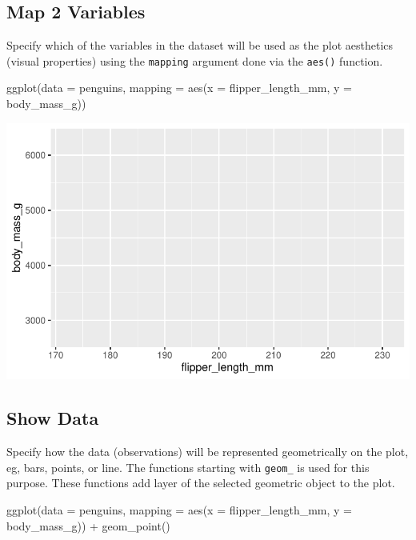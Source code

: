 \documentclass[
  letterpaper,
  DIV=11,
  numbers=noendperiod]{scrreprt}
\newenvironment{Shaded}{\begin{snugshade}}{\end{snugshade}}
\newcommand{\AttributeTok}[1]{\textcolor[rgb]{0.40,0.45,0.13}{#1}}
\newcommand{\FunctionTok}[1]{\textcolor[rgb]{0.28,0.35,0.67}{#1}}
\newcommand{\NormalTok}[1]{\textcolor[rgb]{0.00,0.23,0.31}{#1}}
\newcommand{\SpecialCharTok}[1]{\textcolor[rgb]{0.37,0.37,0.37}{#1}}
\begin{document}
\subsection{Map 2 Variables}\label{map-2-variables}

Specify which of the variables in the dataset will be used as the plot
aesthetics (visual properties) using the \texttt{mapping} argument done
via the \texttt{aes()} function.

\begin{Shaded}
\begin{Highlighting}[]
\FunctionTok{ggplot}\NormalTok{(}\AttributeTok{data =}\NormalTok{ penguins,}
       \AttributeTok{mapping =} \FunctionTok{aes}\NormalTok{(}\AttributeTok{x =}\NormalTok{ flipper\_length\_mm, }\AttributeTok{y =}\NormalTok{ body\_mass\_g))}
\end{Highlighting}
\end{Shaded}

\includegraphics{src/r-for-data-science/01-data-viz_files/figure-pdf/unnamed-chunk-6-1.pdf}

\subsection{Show Data}\label{show-data}

Specify how the data (observations) will be represented geometrically on
the plot, eg, bars, points, or line. The functions starting with
\texttt{geom\_} is used for this purpose. These functions add layer of
the selected geometric object to the plot.

\begin{Shaded}
\begin{Highlighting}[]
\FunctionTok{ggplot}\NormalTok{(}\AttributeTok{data =}\NormalTok{ penguins,}
       \AttributeTok{mapping =} \FunctionTok{aes}\NormalTok{(}\AttributeTok{x =}\NormalTok{ flipper\_length\_mm, }\AttributeTok{y =}\NormalTok{ body\_mass\_g)) }\SpecialCharTok{+}
  \FunctionTok{geom\_point}\NormalTok{()}
\end{Highlighting}
\end{Shaded}
\end{document}
